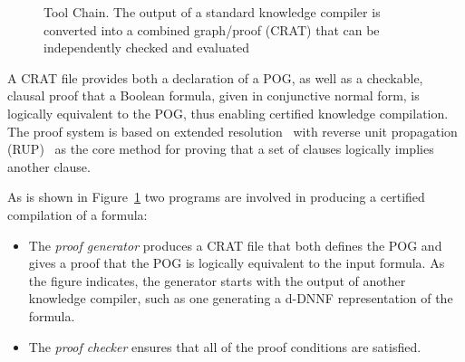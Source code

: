 \documentclass[letterpaper,USenglish,cleveref, autoref, thm-restate]{lipics-v2021}
\begin{document}
\begin{figure}
\caption{Tool Chain. The output of a standard knowledge compiler is converted into a combined graph/proof (CRAT) that can be independently checked and evaluated}
\label{fig:chain}
\end{figure}

A CRAT file provides both a declaration of a POG, as well as a checkable, clausal
proof that a Boolean formula, given in conjunctive normal
form, is logically equivalent to the POG, thus enabling certified
knowledge compilation.  The proof system is based on extended
resolution~\cite{Tseitin:1983} with reverse unit propagation
(RUP)~\cite{goldberg,vangelder08_verifying_rup_proofs} as the core method for
proving that a set of clauses logically implies another clause.

As is shown in Figure~\ref{fig:chain}
two programs are involved in producing a certified compilation of a formula:
\begin{itemize}
\item The {\em proof generator} produces a CRAT file that both defines the POG and gives a proof that the POG is logically equivalent to the input formula.
As the figure indicates, the generator starts with the output of another knowledge compiler, such as one generating a d-DNNF representation of the formula.
\item The {\em proof checker} ensures that all of the proof conditions are satisfied.  
\end{itemize}
\end{document}
